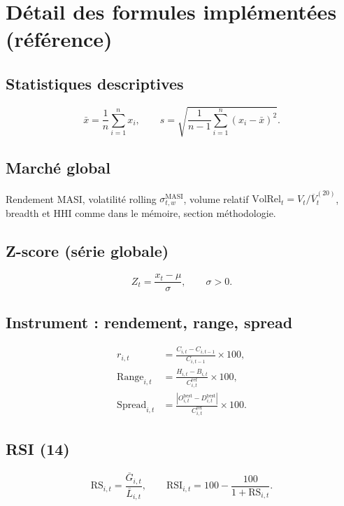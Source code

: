 
\section{Détail des formules implémentées (référence)}
\label{sec:formules_detail}

\subsection{Statistiques descriptives}
\begin{equation}
\bar{x} = \frac{1}{n}\sum_{i=1}^{n} x_i,
\qquad
s = \sqrt{\frac{1}{n-1}\sum_{i=1}^{n}(x_i-\bar{x})^2}.
\end{equation}

\subsection{Marché global}
Rendement MASI, volatilité rolling $\sigma^{\mathrm{MASI}}_{t,w}$, volume relatif $\mathrm{VolRel}_t = V_t/\overline{V}^{(20)}_t$, breadth et HHI comme dans le mémoire, section méthodologie.

\subsection{Z-score (série globale)}
\begin{equation}
Z_t = \frac{x_t-\mu}{\sigma}, \qquad \sigma>0.
\end{equation}

\subsection{Instrument : rendement, range, spread}
\begin{align}
r_{i,t} &= \frac{C_{i,t}-C_{i,t-1}}{C_{i,t-1}}\times 100,\\
\mathrm{Range}_{i,t} &= \frac{H_{i,t}-B_{i,t}}{C^{\mathrm{ref}}_{i,t}}\times 100,\\
\mathrm{Spread}_{i,t} &= \frac{\left|O^{\mathrm{best}}_{i,t}-D^{\mathrm{best}}_{i,t}\right|}{C^{\mathrm{ref}}_{i,t}}\times 100.
\end{align}

\subsection{RSI (14)}
\begin{equation}
\mathrm{RS}_{i,t} = \frac{\overline{G}_{i,t}}{\overline{L}_{i,t}},
\qquad
\mathrm{RSI}_{i,t} = 100 - \frac{100}{1+\mathrm{RS}_{i,t}}.
\end{equation}

